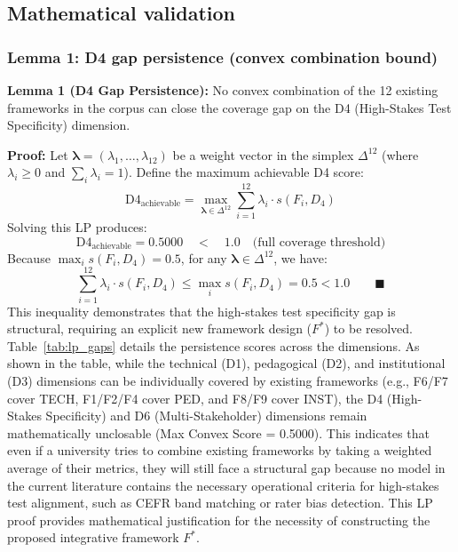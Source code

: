 \documentclass[11pt,a4paper]{article}
\begin{document}
\subsection{Mathematical validation}

\subsubsection{Lemma 1: D4 gap persistence (convex combination bound)}
\textbf{Lemma 1 (D4 Gap Persistence):} No convex combination of the 12 existing frameworks in the corpus can close the coverage gap on the D4 (High-Stakes Test Specificity) dimension.

\textbf{Proof:} Let $\boldsymbol{\lambda} = (\lambda_1, \ldots, \lambda_{12})$ be a weight vector in the simplex $\Delta^{12}$ (where $\lambda_i \geq 0$ and $\sum_i \lambda_i = 1$). Define the maximum achievable D4 score:
\begin{equation}
  \text{D4}_{\text{achievable}} = \max_{\boldsymbol{\lambda} \in \Delta^{12}} \sum_{i=1}^{12} \lambda_i \cdot s(F_i, D_4)
\end{equation}
Solving this LP produces:
\begin{equation}
  \text{D4}_{\text{achievable}} = 0.5000 \quad < \quad 1.0 \quad \text{(full coverage threshold)}
\end{equation}
Because $\max_{i} s(F_i, D_4) = 0.5$, for any $\boldsymbol{\lambda} \in \Delta^{12}$, we have:
\begin{equation}
  \sum_{i=1}^{12} \lambda_i \cdot s(F_i, D_4) \leq \max_i s(F_i, D_4) = 0.5 < 1.0 \qquad \blacksquare
\end{equation}
This inequality demonstrates that the high-stakes test specificity gap is structural, requiring an explicit new framework design ($F^*$) to be resolved. Table~\ref{tab:lp_gaps} details the persistence scores across the dimensions. As shown in the table, while the technical (D1), pedagogical (D2), and institutional (D3) dimensions can be individually covered by existing frameworks (e.g., F6/F7 cover TECH, F1/F2/F4 cover PED, and F8/F9 cover INST), the D4 (High-Stakes Specificity) and D6 (Multi-Stakeholder) dimensions remain mathematically unclosable (Max Convex Score = 0.5000). This indicates that even if a university tries to combine existing frameworks by taking a weighted average of their metrics, they will still face a structural gap because no model in the current literature contains the necessary operational criteria for high-stakes test alignment, such as CEFR band matching or rater bias detection. This LP proof provides mathematical justification for the necessity of constructing the proposed integrative framework $F^*$.
\end{document}
